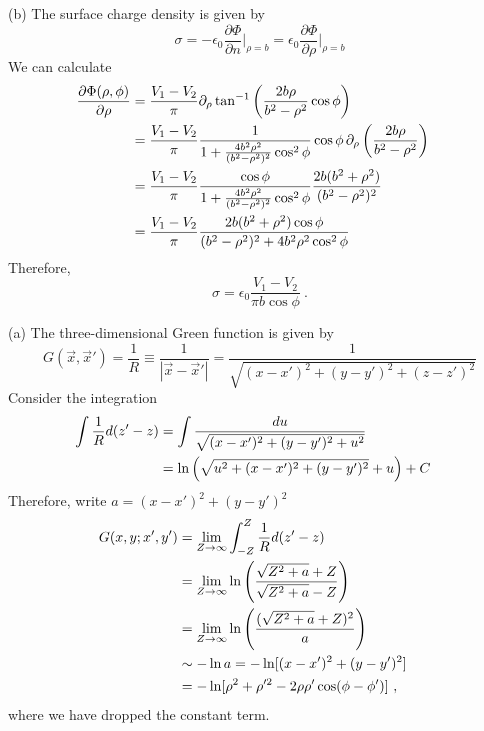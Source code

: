 \documentclass[12pt]{article}
\begin{document}
\newpage
{} (b) The surface charge density is given by
\begin{equation}
    \sigma = - \epsilon_0 \frac{\partial \Phi}{\partial n} \Bigg|_{\rho = b} = \epsilon_0\frac{\partial \Phi}{\partial \rho} \Bigg|_{\rho = b}
\end{equation}
We can calculate
\begin{align}
    \frac{\partial \Phi(\rho, \phi)}{\partial \rho} &= \frac{V_1 - V_2}{\pi} \partial_\rho \tan^{-1}\left(\frac{2b\rho}{b^2 - \rho^2} \cos \phi\right) \cr
    &= \frac{V_1 - V_2}{\pi} \frac{1}{1+ \frac{4b^2 \rho^2}{(b^2 - \rho^2)^2} \cos^2 \phi} \cos \phi\, \partial_\rho \left(\frac{2b\rho}{b^2 - \rho^2}\right)\cr
    & = \frac{V_1 - V_2}{\pi} \frac{\cos \phi}{1+ \frac{4b^2 \rho^2}{(b^2 - \rho^2)^2} \cos^2 \phi} \frac{2b(b^2 + \rho^2)}{(b^2-\rho^2)^2}\cr
    &= \frac{V_1 - V_2}{\pi} \frac{2b (b^2 + \rho^2)\cos \phi}{(b^2 - \rho^2)^2 + 4 b^2 \rho^2 \cos^2 \phi}
\end{align}
Therefore,
\begin{equation}
    \sigma = \epsilon_0\frac{V_1 - V_2}{\pi b \cos\phi}~.
\end{equation}


\newpage
{} (a) The three-dimensional Green function is given by
\begin{equation}
    G(\vec x, \vec x') = \frac{1}{R} \equiv \frac{1}{|\vec x - \vec x'|} = \frac{1}{\sqrt{(x - x')^2 + (y - y')^2 + (z - z')^2}}
\end{equation}
Consider the integration
\begin{align}
    \int \frac 1 R d(z'-z) &= \int \frac{du}{\sqrt{(x-x')^2 + (y-y')^2 +u^2}}\cr
    &= \ln\left(\sqrt{u^2 + (x-x')^2 + (y - y')^2} + u\right) + C
\end{align}
Therefore, write $a = (x-x')^2 + (y - y')^2$
\begin{align}
    G(x,y;x',y') &= \lim_{Z\to \infty} \int_{-Z}^Z \frac{1}{R} d(z'-z)\cr
    &= \lim_{Z \to \infty} \ln\left(\frac{\sqrt{Z^2 + a} + Z}{\sqrt{Z^2 + a} - Z}\right) \cr
    &= \lim_{Z\to \infty}\ln\left(\frac{(\sqrt{Z^2 + a} + Z)^2}{a}\right)\cr
    &\sim - \ln a = -\ln[(x-x')^2 + (y - y')^2]\cr
    &= - \ln[\rho^2 + \rho'^2 - 2\rho \rho' \cos(\phi - \phi')]~,
\end{align}
where we have dropped the constant term.
\end{document}
